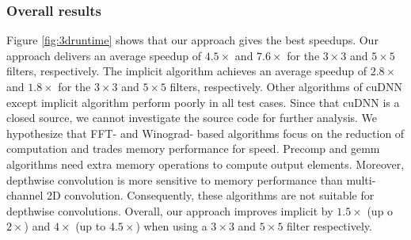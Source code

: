 \subsubsection{Overall results}
Figure \ref{fig:3druntime} shows that our approach gives the best speedups. 
Our approach delivers an average speedup of $4.5\times$ and $7.6\times$ for the $3 \times 3$ and $5 \times 5$ filters, respectively. 
The implicit algorithm achieves an average speedup of $2.8\times$ and $1.8\times$ for the $3 \times 3$ and $5 \times 5$ filters, respectively.
Other algorithms of cuDNN except implicit algorithm perform poorly in all test cases. 
Since that cuDNN is a closed source, we cannot investigate the source code for further analysis. 
We hypothesize that FFT- and Winograd- based algorithms focus on the reduction of computation and trades memory performance for speed. 
Precomp and gemm algorithms need extra memory operations to compute output elements. Moreover, depthwise convolution is more sensitive to memory performance than multi-channel 2D convolution. 
Consequently, these algorithms are not suitable for
depthwise convolutions. 
Overall, our approach improves implicit by $1.5\times$ (up o $2\times$) and $4\times$ (up to $4.5\times$) when using a $3 \times 3$ and $5 \times 5$ filter respectively.

%
\begin{figure}
    \centering
%
\end{figure}




	
